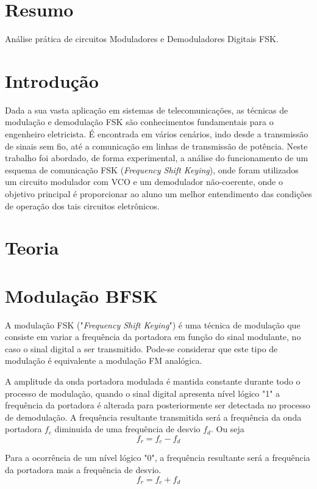 \documentclass[12pt,a4paper]{article}%
\begin{document}


\section{Resumo}
Análise prática de circuitos Moduladores e Demoduladores Digitais FSK.
\newpage

\newpage
\section{Introdução}
Dada a sua vasta aplicação em sistemas de telecomunicações, as técnicas de modulação e demodulação FSK são conhecimentos fundamentais para o engenheiro eletricista. É encontrada em vários cenários, indo desde a transmissão de sinais sem fio, até a comunicação em linhas de transmissão de potência.
Neste trabalho foi abordado, de forma experimental, a análise do funcionamento de um esquema de comunicação FSK (\textit{Frequency Shift Keying}), onde foram utilizados um circuito modulador com VCO e um demodulador não-coerente, onde o objetivo principal é proporcionar ao aluno um melhor entendimento das condições de operação dos tais circuitos eletrônicos.

\newpage
\section{Teoria}

\section{Modulação BFSK}
A modulação FSK ("\emph{Frequency Shift Keying}") é uma técnica de modulação que consiste em variar a frequência da portadora em função do sinal modulante, no caso o sinal digital a ser transmitido.
Pode-se considerar que este tipo de modulação é equivalente a modulação FM analógica.

A amplitude da onda portadora modulada é mantida constante durante todo o processo de modulação, quando o sinal digital apresenta nível lógico "1" a frequência da portadora é alterada para posteriormente ser detectada no processo de demodulação.
A frequência resultante transmitida será a frequência da onda portadora $f_c$ diminuida de uma frequência de desvio $f_d$.
Ou seja
\begin{equation}
    f_r = f_c - f_d
\end{equation}

Para a ocorrência de um nível lógico "0", a frequência resultante será a frequência da portadora mais a frequência de desvio.
\begin{equation}
    f_r = f_c + f_d
\end{equation}
\end{document}
